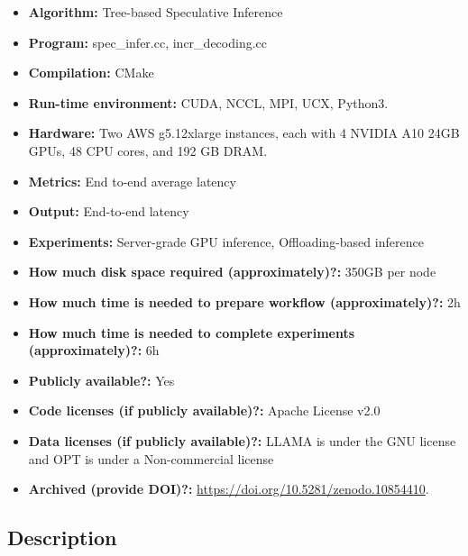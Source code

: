 {\small
\begin{itemize}
  \item {\bf Algorithm: } Tree-based Speculative Inference
  \item {\bf Program: } spec\_infer.cc, incr\_decoding.cc
  \item {\bf Compilation: } CMake
  \item {\bf Run-time environment: } CUDA, NCCL, MPI, UCX, Python3.
  \item {\bf Hardware: }  Two AWS g5.12xlarge instances, each with 4 NVIDIA A10 24GB GPUs, 48 CPU cores, and 192 GB DRAM.
  \item {\bf Metrics: } End to-end average latency
  \item {\bf Output: } End-to-end latency
  \item {\bf Experiments: } Server-grade GPU inference, Offloading-based inference
  \item {\bf How much disk space required (approximately)?: } 350GB per node
  \item {\bf How much time is needed to prepare workflow (approximately)?: } 2h
  \item {\bf How much time is needed to complete experiments (approximately)?: } 6h
  \item {\bf Publicly available?: } Yes
  \item {\bf Code licenses (if publicly available)?: } Apache License v2.0
  \item {\bf Data licenses (if publicly available)?: } LLAMA is under the GNU license and OPT is under a Non-commercial license%
  \item {\bf Archived (provide DOI)?: }\url{https://doi.org/10.5281/zenodo.10854410}.
\end{itemize}
}

\subsection{Description}

